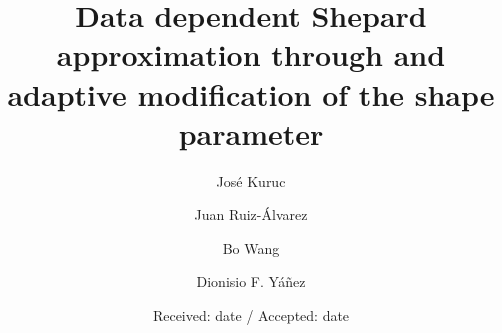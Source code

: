 \documentclass[preprint]{elsarticle}       %
\begin{document}
\small

\begin{frontmatter}

\title{Data dependent Shepard approximation through and adaptive modification of the shape parameter}

\author[UPCT]{Jos\'e Kuruc}
\author[UPCT]{Juan Ruiz-\'Alvarez}
\author[HNU]{Bo Wang}
\author[UV]{Dionisio F. Y\'a\~nez}

\date{Received: date / Accepted: date}


\address[UPCT]{Departamento de Matem\'atica Aplicada y Estad\'istica. Universidad  Polit\'ecnica de Cartagena, Cartagena (Spain).}
\address[HNU]{School of Mathematics and Statistics, Institute of Interdisciplinary Studies, Hunan Normal University, Hunan 410081, (P. R. China).}
\address[UV]{Departamento de Matem\'aticas. Universidad de Valencia, Valencia (Spain).}




\end{frontmatter}
\end{document}
